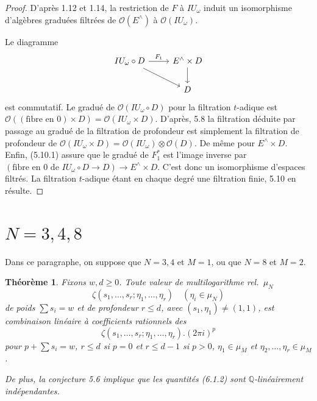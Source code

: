 \documentclass[11pt,a4paper]{article}
\theoremstyle{plain}
\newtheorem{theorem}{Th\'eor\`eme}[section]
\theoremstyle{definition}
\newcommand{\Q}{\mathbb{Q}}
\begin{document}
\begin{proof}
D'apr\`es 1.12 et 1.14, la restriction de $F$ \`a $IU_\omega$ induit un isomorphisme d'alg\`ebres gradu\'ees filtr\'ees de $\mathcal{O}(E^{\wedge})$ \`a $\mathcal{O}(IU_\omega)$.

Le diagramme
\begin{equation}\label{eq:5.10.1}
\begin{tikzcd}
IU_\omega \circ D \arrow{r}{F_1} \arrow{dr} & E^{\wedge} \times D \arrow{d} \\
& D
\end{tikzcd}
\end{equation}
est commutatif. Le gradu\'e de $\mathcal{O}(IU_\omega \circ D)$ pour la filtration $t$-adique est $\mathcal{O}((\text{fibre en } 0) \times D) = \mathcal{O}(IU_\omega \times D)$. D'apr\`es, 5.8 la filtration d\'eduite par passage au gradu\'e de la filtration de profondeur est simplement la filtration de profondeur de $\mathcal{O}(IU_\omega \times D) = \mathcal{O}(IU_\omega) \otimes \mathcal{O}(D)$. De m\^eme pour $E^{\wedge} \times D$. Enfin, (5.10.1) assure que le gradu\'e de $F_1^*$ est l'image inverse par $(\text{fibre en } 0 \text{ de } IU_\omega \circ D \to D) \to E^{\wedge} \times D$. C'est donc un isomorphisme d'espaces filtr\'es. La filtration $t$-adique \'etant en chaque degr\'e une filtration finie, 5.10 en r\'esulte.
\end{proof}

\section{$N=3,4,8$}
\label{sec:6}

Dans ce paragraphe, on suppose que $N=3,4$ et $M=1$, ou que $N=8$ et $M=2$.

\begin{theorem}\label{thm:6.1}
Fixons $w, d \geq 0$. Toute valeur de multilogarithme rel.~$\mu_N$
\begin{equation}\label{eq:6.1.1}
\zeta(s_1,\ldots,s_r; \eta_1,\ldots, \eta_r) \quad (\eta_i \in \mu_N)
\end{equation}
de poids $\sum s_i = w$ et de profondeur $r \leq d$, avec $(s_1, \eta_1) \neq (1,1)$, est combinaison lin\'eaire \`a coefficients rationnels des
\begin{equation}\label{eq:6.1.2}
\zeta(s_1,\ldots,s_r; \eta_1,\ldots, \eta_r).(2\pi i)^p
\end{equation}
pour $p + \sum s_i = w$, $r \leq d$ si $p=0$ et $r \leq d-1$ si $p > 0$, $\eta_1 \in \mu_M$ et $\eta_2,\ldots,\eta_r \in \mu_M$.

De plus, la conjecture 5.6 implique que les quantit\'es (6.1.2) sont $\Q$-lin\'eairement ind\'ependantes.
\end{theorem}
\end{document}
